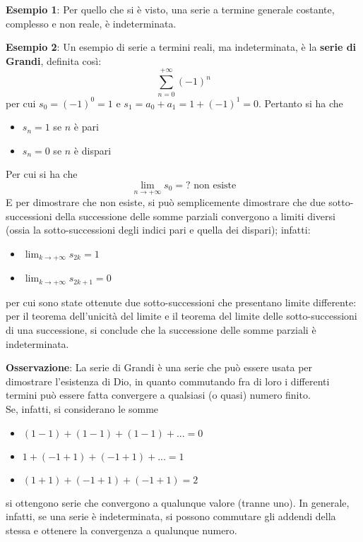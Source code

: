 \documentclass[a4paper]{extarticle}
\begin{document}
\vspace{2em}
\noindent
\textbf{Esempio 1}: Per quello che si è visto, una serie a termine generale costante, complesso e non reale, è indeterminata.

\vspace{1em}
\noindent
\textbf{Esempio 2}: Un esempio di serie a termini reali, ma indeterminata, è la \textbf{serie di Grandi}, definita così:
\[\sum_{n=0}^{+\infty} (-1)^n\]
per cui $s_0=(-1)^0=1$ e $s_1=a_0+a_1=1+(-1)^1=0$. Pertanto si ha che
\begin{itemize}
    \item $s_n=1$ se $n$ è pari
    \item $s_n=0$ se $n$ è dispari
\end{itemize}
Per cui si ha che
\[\lim_{n \to +\infty} s_0 = ? \text{ non esiste}\]
E per dimostrare che non esiste, si può semplicemente dimostrare che due sotto-successioni della successione delle somme parziali convergono a limiti diversi (ossia la sotto-successioni degli indici pari e quella dei dispari); infatti:
\begin{itemize}
    \item $\displaystyle{\lim_{k \to +\infty} s_{2k} = 1}$
    \item $\displaystyle{\lim_{k \to +\infty} s_{2k+1} = 0}$
\end{itemize}
per cui sono state ottenute due sotto-successioni che presentano limite differente: per il teorema dell'unicità del limite e il teorema del limite delle sotto-successioni di una successione, si conclude che la successione delle somme parziali è indeterminata.

\vspace{1em}
\noindent
\textbf{Osservazione}: La serie di Grandi è una serie che può essere usata per dimostrare l'esistenza di Dio, in quanto commutando fra di loro i differenti termini può essere fatta convergere a qualsiasi (o quasi) numero finito.\\
Se, infatti, si considerano le somme
\begin{itemize}
    \item $(1-1)+(1-1)+(1-1)+...=0$
    \item $1+(-1+1)+(-1+1)+...=1$
    \item $(1+1)+(-1+1)+(-1+1)=2$
\end{itemize}
si ottengono serie che convergono a qualunque valore (tranne uno). In generale, infatti, se una serie è indeterminata, si possono commutare gli addendi della stessa e ottenere la convergenza a qualunque numero.
\end{document}

